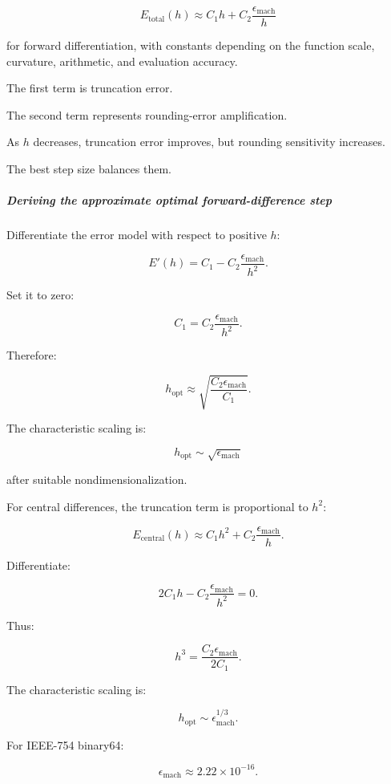 \[
\boxed{ E_{\mathrm{total}}(h) \approx C_1h+C_2\frac{\epsilon_{\mathrm{mach}}}{h} }
\]

for forward differentiation, with constants depending on the function scale, curvature, arithmetic, and evaluation accuracy.

The first term is truncation error.

The second term represents rounding-error amplification.

As \(h\) decreases, truncation error improves, but rounding sensitivity increases.

The best step size balances them.

\subparagraph{Deriving the approximate optimal forward-difference step}\label{02-foundations-ii-ch025-deriving-the-approximate-optimal-forward-difference-step}

\hypertarget{02-foundations-ii-ch025-deriving-the-approximate-optimal-forward-difference-step}{}

Differentiate the error model with respect to positive \(h\):

\[
E'(h)= C_1- C_2\frac{\epsilon_{\mathrm{mach}}}{h^2}.
\]

Set it to zero:

\[
C_1= C_2\frac{\epsilon_{\mathrm{mach}}}{h^2}.
\]

Therefore:

\[
\boxed{ h_{\mathrm{opt}} \approx \sqrt{\frac{C_2\epsilon_{\mathrm{mach}}}{C_1}} }.
\]

The characteristic scaling is:

\[
h_{\mathrm{opt}}\sim\sqrt{\epsilon_{\mathrm{mach}}}
\]

after suitable nondimensionalization.

For central differences, the truncation term is proportional to \(h^2\):

\[
E_{\mathrm{central}}(h) \approx C_1h^2+ C_2\frac{\epsilon_{\mathrm{mach}}}{h}.
\]

Differentiate:

\[
2C_1h- C_2\frac{\epsilon_{\mathrm{mach}}}{h^2}=0.
\]

Thus:

\[
h^3= \frac{C_2\epsilon_{\mathrm{mach}}}{2C_1}.
\]

The characteristic scaling is:

\[
\boxed{ h_{\mathrm{opt}}\sim \epsilon_{\mathrm{mach}}^{1/3} }.
\]

For IEEE-754 binary64:

\[
\epsilon_{\mathrm{mach}} \approx2.22\times10^{-16}.
\]


